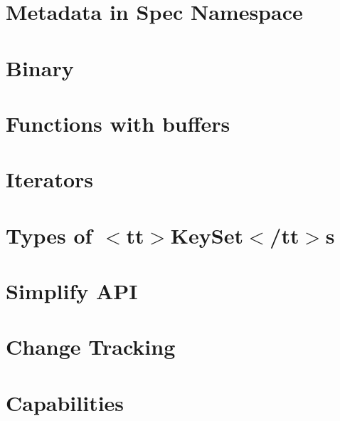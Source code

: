 \let\mypdfximage\pdfximage\def\pdfximage{\immediate\mypdfximage}\documentclass[twoside]{book}
\newcommand{\+}{\discretionary{\mbox{\scriptsize$\hookleftarrow$}}{}{}}
\begin{document}
\chapter{Metadata in Spec Namespace}
\label{doc_decisions_1_problem_clear_spec_metadata_md}

\chapter{Binary}
\label{doc_decisions_2_solutions_clear_binary_md}

\chapter{Functions with buffers}
\label{doc_decisions_2_solutions_clear_functions_with_buffers_md}

\chapter{Iterators}
\label{doc_decisions_2_solutions_clear_iterators_md}

\chapter{Types of $<$tt$>$Key\+Set$<$/tt$>$s}
\label{doc_decisions_2_solutions_clear_keyset_types_md}

\chapter{Simplify API}
\label{doc_decisions_2_solutions_clear_simplify_api_md}

\chapter{Change Tracking}
\label{doc_decisions_3_in_review_change_tracking_md}

\chapter{Capabilities}
\label{doc_decisions_4_decided_capabilities_md}

\end{document}
